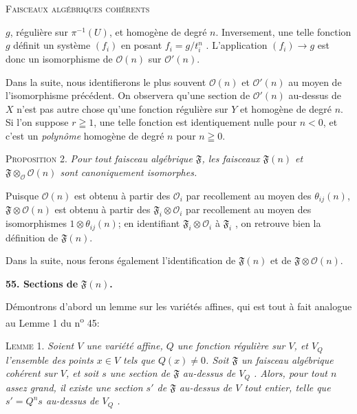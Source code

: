 

\textsc{Faisceaux algébriques cohérents}

 $g$, régulière sur $\pi^{-1}(U)$, et homogène de degré $n$. Inversement, une telle fonction $g$ définit un système $(f_i)$ en posant $f_i = g/t_i^n$ . L'application $(f_i) \to g$ est donc un isomorphisme de $\mathcal{O}(n)$ sur $\mathcal{O}'(n)$.

Dans la suite, nous identifierons le plus souvent $\mathcal{O}(n)$ et $\mathcal{O}'(n)$ au moyen de l'isomorphisme précédent. On observera qu'une section de $\mathcal{O}'(n)$ au-dessus de $X$ n'est pas autre chose qu'une fonction régulière sur $Y$ et homogène de degré $n$. Si l'on suppose $r \geqq 1$, une telle fonction est identiquement nulle pour $n < 0$, et c'est un \textit{polynôme} homogène de degré $n$ pour $n \geqq 0$.

\textsc{Proposition} 2. \textit{Pour tout faisceau algébrique $\mathfrak{F}$, les faisceaux $\mathfrak{F}(n)$ et $\mathfrak{F} \otimes_{\mathcal{O}} \mathcal{O}(n)$ sont canoniquement isomorphes.}

Puisque $\mathcal{O}(n)$ est obtenu à partir des $\mathcal{O}_i$ par recollement au moyen des $\theta_{ij}(n)$, $\mathfrak{F} \otimes \mathcal{O}(n)$ est obtenu à partir des $\mathfrak{F}_i \otimes \mathcal{O}_i$ par recollement au moyen des isomorphismes $1 \otimes \theta_{ij}(n)$; en identifiant $\mathfrak{F}_i \otimes \mathcal{O}_i$ à $\mathfrak{F}_i$ , on retrouve bien la définition de $\mathfrak{F}(n)$.

Dans la suite, nous ferons également l'identification de $\mathfrak{F}(n)$ et de $\mathfrak{F} \otimes \mathcal{O}(n)$.


\textbf{55. Sections de} $\mathfrak{F}(n)$\textbf{.}

Démontrons d'abord un lemme sur les variétés affines, qui est tout à fait analogue au Lemme 1 du n\textsuperscript{o} 45:

\textsc{Lemme} 1. \textit{Soient $V$ une variété affine, $Q$ une fonction régulière sur $V$, et $V_Q$ l'ensemble des points $x \in V$ tels que $Q(x) \neq 0$. Soit $\mathfrak{F}$ un faisceau algébrique cohérent sur $V$, et soit $s$ une section de $\mathfrak{F}$ au-dessus de $V_Q$ . Alors, pour tout $n$ assez grand, il existe une section $s'$ de $\mathfrak{F}$ au-dessus de $V$ tout entier, telle que $s' = Q^n s$ au-dessus de $V_Q$ .}

